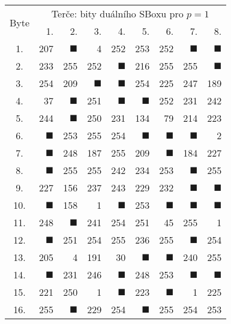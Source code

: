 \begin{tabular}{| c | r | r | r | r | r | r | r | r |}
	\hline
	\multirow{2}{*}{Byte} & \multicolumn{8}{c|}{Terče: bity duálního SBoxu pro $p=1$} \\
	\cline{2-9}
	~ & 1. & 2. & 3. & 4. & 5. & 6. & 7. & 8. \\
	\hline
	1.&207&$\blacksquare$&4&252&253&252&$\blacksquare$&$\blacksquare$\\
	\hline
	2.&233&255&252&$\blacksquare$&216&255&255&$\blacksquare$\\
	\hline
	3.&254&209&$\blacksquare$&$\blacksquare$&254&225&247&189\\
	\hline
	4.&37&$\blacksquare$&251&$\blacksquare$&$\blacksquare$&252&231&242\\
	\hline
	5.&244&$\blacksquare$&250&231&134&79&214&223\\
	\hline
	6.&$\blacksquare$&253&255&254&$\blacksquare$&$\blacksquare$&$\blacksquare$&2\\
	\hline
	7.&$\blacksquare$&248&187&255&209&$\blacksquare$&184&227\\
	\hline
	8.&$\blacksquare$&255&255&242&234&253&$\blacksquare$&255\\
	\hline
	9.&227&156&237&243&229&232&$\blacksquare$&$\blacksquare$\\
	\hline
	10.&$\blacksquare$&158&1&$\blacksquare$&253&$\blacksquare$&$\blacksquare$&$\blacksquare$\\
	\hline
	11.&248&$\blacksquare$&241&254&251&45&255&1\\
	\hline
	12.&$\blacksquare$&251&254&255&236&255&$\blacksquare$&254\\
	\hline
	13.&205&4&191&30&$\blacksquare$&$\blacksquare$&240&255\\
	\hline
	14.&$\blacksquare$&231&246&$\blacksquare$&248&253&$\blacksquare$&$\blacksquare$\\
	\hline
	15.&221&250&1&$\blacksquare$&223&$\blacksquare$&1&225\\
	\hline
	16.&255&$\blacksquare$&229&254&$\blacksquare$&255&254&253\\
	\hline
\end{tabular}